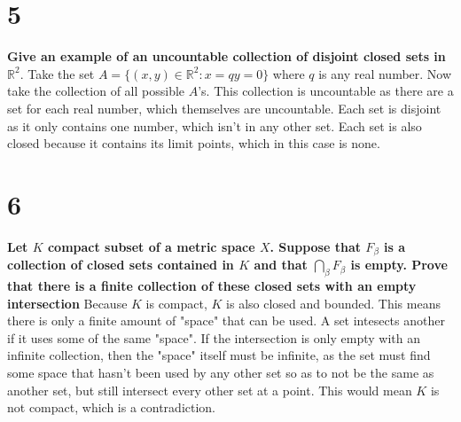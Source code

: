 \documentclass{article}
\begin{document}
\section* {5}
\noindent \textbf{Give an example of an uncountable collection of disjoint closed sets in $\mathbb{R}^2.$}
Take the set $A = \{(x,y) \in \mathbb{R}^2 : x = q y = 0\}$ where $q$ is any real number. Now take the collection of all possible $A$'s. This collection is uncountable as there are a set for each real number, which themselves are uncountable. Each set is disjoint as it only contains one number, which isn't in any other set. Each set is also closed because it contains its limit points, which in this case is none. 
\section* {6}
\noindent \textbf{Let $K$ compact subset of a metric space $X$. Suppose that $F_\beta$ is a collection of closed sets contained in $K$ and that $\bigcap_\beta F_\beta$ is empty. Prove that there is a finite collection of these closed sets with an empty intersection }
Because $K$ is compact, $K$ is also closed and bounded. This means there is only a finite amount of "space" that can be used. A set intesects another if it uses some of the same "space". If the intersection is only empty with an infinite collection, then the "space" itself must be infinite, as the set must find some space that hasn't been used by any other set so as to not be the same as another set, but still intersect every other set at a point. This would mean $K$ is not compact, which is a contradiction.
\end{document}
